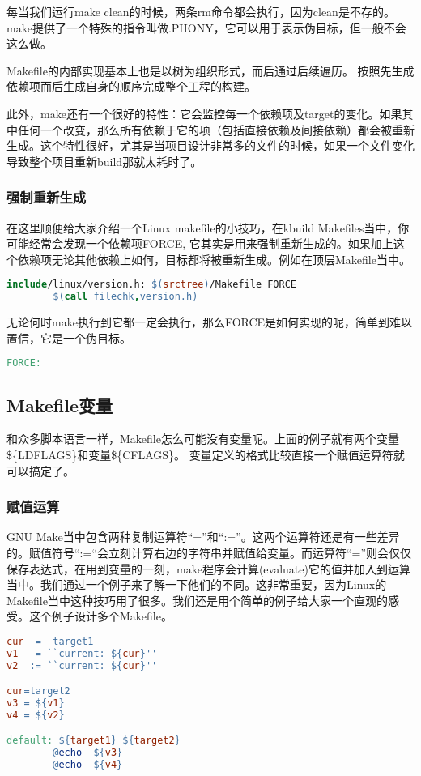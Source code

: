 每当我们运行make clean的时候，两条rm命令都会执行，因为clean是不存的。make提供了一个特殊的指令叫做.PHONY，它可以用于表示伪目标，但一般不会这么做。

Makefile的内部实现基本上也是以树为组织形式，而后通过后续遍历。
按照先生成依赖项而后生成自身的顺序完成整个工程的构建。

此外，make还有一个很好的特性：它会监控每一个依赖项及target的变化。如果其中任何一个改变，那么所有依赖于它的项（包括直接依赖及间接依赖）都会被重新生成。这个特性很好，尤其是当项目设计非常多的文件的时候，如果一个文件变化导致整个项目重新build那就太耗时了。

\subsubsection{强制重新生成}
在这里顺便给大家介绍一个Linux makefile的小技巧，在kbuild Makefiles当中，你可能经常会发现一个依赖项FORCE, 它其实是用来强制重新生成的。如果加上这个依赖项无论其他依赖上如何，目标都将被重新生成。例如在顶层Makefile当中。
\begin{lstlisting}[language=make]
include/linux/version.h: $(srctree)/Makefile FORCE
        $(call filechk,version.h)
\end{lstlisting}
无论何时make执行到它都一定会执行，那么FORCE是如何实现的呢，简单到难以置信，它是一个伪目标。
\begin{lstlisting}[language=make]
FORCE:

\end{lstlisting}

\subsection{Makefile变量}
和众多脚本语言一样，Makefile怎么可能没有变量呢。上面的例子就有两个变量\$\{LDFLAGS\}和变量\$\{CFLAGS\}。
变量定义的格式比较直接一个赋值运算符就可以搞定了。


\subsubsection{赋值运算}
GNU Make当中包含两种复制运算符“=”和“:=”。这两个运算符还是有一些差异的。赋值符号“:=“会立刻计算右边的字符串并赋值给变量。而运算符“=”则会仅仅保存表达式，在用到变量的一刻，make程序会计算(evaluate)它的值并加入到运算当中。我们通过一个例子来了解一下他们的不同。这非常重要，因为Linux的Makefile当中这种技巧用了很多。我们还是用个简单的例子给大家一个直观的感受。这个例子设计多个Makefile。

\begin{lstlisting}[language=make]
cur  =  target1
v1   = ``current: ${cur}''
v2  := ``current: ${cur}''

cur=target2
v3 = ${v1}
v4 = ${v2}

default: ${target1} ${target2}
        @echo  ${v3}
        @echo  ${v4}
\end{lstlisting}

